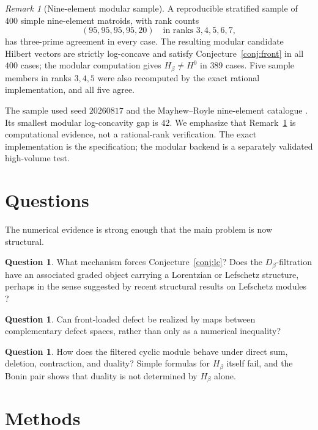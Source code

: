 \documentclass[11pt]{amsart}
\theoremstyle{definition}
\newtheorem{question}[thm]{Question}
\theoremstyle{remark}
\newtheorem{remark}[thm]{Remark}
\begin{document}
\begin{remark}[Nine-element modular sample]\label{rem:n9}
A reproducible stratified sample of $400$ simple nine-element matroids, with rank counts
\[
(95,95,95,95,20)\quad\text{in ranks }3,4,5,6,7,
\]
has three-prime agreement in every case. The resulting modular candidate Hilbert vectors are strictly log-concave and satisfy Conjecture~\ref{conj:front} in all $400$ cases; the modular computation gives $H_\beta\ne H^0$ in $389$ cases. Five sample members in ranks $3,4,5$ were also recomputed by the exact rational implementation, and all five agree.
\end{remark}

The sample used seed $20260817$ and the Mayhew--Royle nine-element catalogue \cite{MayhewRoyle}. Its smallest modular log-concavity gap is $42$. We emphasize that Remark~\ref{rem:n9} is computational evidence, not a rational-rank verification.  The exact implementation is the specification; the modular backend is a separately validated high-volume test.

\section{Questions}\label{sec:questions}

The numerical evidence is strong enough that the main problem is now structural.

\begin{question}
What mechanism forces Conjecture~\ref{conj:lc}?  Does the $D_\beta$-filtration have an associated graded object carrying a Lorentzian or Lefschetz structure, perhaps in the sense suggested by recent structural results on Lefschetz modules \cite{AminiHuhLarson}?
\end{question}

\begin{question}
Can front-loaded defect be realized by maps between complementary defect spaces, rather than only as a numerical inequality?
\end{question}

\begin{question}
How does the filtered cyclic module behave under direct sum, deletion, contraction, and duality?  Simple formulas for $H_\beta$ itself fail, and the Bonin pair shows that duality is not determined by $H_\beta$ alone.
\end{question}


\section*{Methods}
\end{document}
